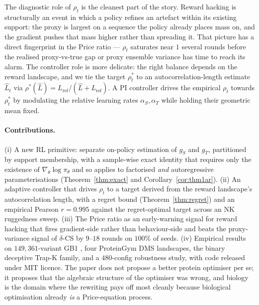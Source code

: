 The diagnostic role of $\rho_t$ is the cleanest part of the story. Reward hacking is structurally an event in which a policy refines an artefact within its existing support: the proxy is largest on a sequence the policy already places mass on, and the gradient pushes that mass higher rather than spreading it. That picture has a direct fingerprint in the Price ratio --- $\rho_t$ saturates near $1$ several rounds before the realised proxy-vs-true gap or proxy ensemble variance has time to reach its alarm. The controller role is more delicate: the right balance depends on the reward landscape, and we tie the target $\rho^*_t$ to an autocorrelation-length estimate $\hat L_t$ via $\rho^*(\hat L) = L_{\mathrm{ref}}/(\hat L + L_{\mathrm{ref}})$. A PI controller drives the empirical $\rho_t$ towards $\rho^*_t$ by modulating the relative learning rates $\alpha_S, \alpha_T$ while holding their geometric mean fixed.

\paragraph{Contributions.} (i) A new RL primitive: separate on-policy estimation of $g_S$ and $g_T$, partitioned by support membership, with a sample-wise exact identity that requires only the existence of $\nabla_\theta \log\pi_\theta$ and so applies to factorised \emph{and} autoregressive parameterisations (Theorem~\ref{thm:exact} and Corollary~\ref{cor:thm1ar}). (ii) An adaptive controller that drives $\rho_t$ to a target derived from the reward landscape's autocorrelation length, with a regret bound (Theorem~\ref{thm:regret}) and an empirical Pearson $r=0.995$ against the regret-optimal target across an NK ruggedness sweep. (iii) The Price ratio as an early-warning signal for reward hacking that fires gradient-side rather than behaviour-side and beats the proxy-variance signal of $\delta$-CS by $9$--$18$ rounds on $100\%$ of seeds. (iv) Empirical results on $149{,}361$-variant GB1 \citep{wu2016adaptation}, four ProteinGym DMS landscapes, the binary deceptive Trap-K family, and a $480$-config robustness study, with code released under MIT licence. The paper does not propose a better protein optimiser per se; it proposes that the algebraic structure of the optimiser was wrong, and biology is the domain where the rewriting pays off most cleanly because biological optimisation already \emph{is} a Price-equation process.
